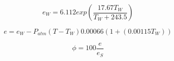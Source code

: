 \begin{equation}
e_W = 6.112 exp \left( \frac{17.67 T_W}{T_W + 243.5} \right)
\label{eq:rh_ew}
\end{equation}

\begin{equation}
e = e_W - P_{atm} (T - T_W) 0.00066(1 +( 0.00115T_W))
\label{eq:rh_e}
\end{equation}

\begin{equation}
\phi = 100 \frac{e}{e_S}
\label{eq:rh_rh}
\end{equation}










